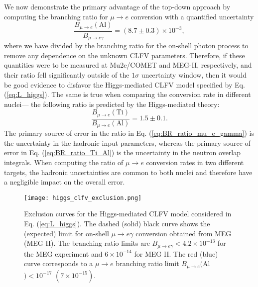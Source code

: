 \documentclass{book}[letterpaper,12pt]
\begin{document}
We now demonstrate the primary advantage of the top-down approach by computing the branching ratio for $\mu\rightarrow e$ conversion with a quantified uncertainty 
\begin{equation}
\frac{B_{\mu\rightarrow e}(\mathrm{Al})}{B_{\mu\rightarrow e\gamma}}=\left(8.7\pm 0.3\right)\times 10^{-3},
\label{eq:BR_ratio_mu_e_gamma}
\end{equation}
where we have divided by the branching ratio for the on-shell photon process to remove any dependence on the unknown CLFV parameters. Therefore, if these quantities were to be measured at Mu2e/COMET and MEG-II, respectively, and their ratio fell significantly outside of the $1\sigma$ uncertainty window, then it would be good evidence to disfavor the Higgs-mediated CLFV model specified by Eq. (\ref{eq:L_higgs}). The same is true when comparing the conversion rate in different nuclei--- the following ratio is predicted by the Higgs-mediated theory:
\begin{equation}
\frac{B_{\mu\rightarrow e}(\mathrm{Ti})}{B_{\mu\rightarrow e}(\mathrm{Al})}=1.5\pm 0.1.
\label{eq:BR_ratio_Ti_Al}
\end{equation}
The primary source of error in the ratio in Eq. (\ref{eq:BR_ratio_mu_e_gamma}) is the uncertainty in the hadronic input parameters, whereas the primary source of error in Eq. (\ref{eq:BR_ratio_Ti_Al}) is the uncertainty in the neutron overlap integrals. When computing the ratio of $\mu\rightarrow e$ conversion rates in two different targets, the hadronic uncertainties are common to both nuclei and therefore have a negligible impact on the overall error.
\begin{figure}
\centering
\texttt{[image: higgs\_clfv\_exclusion.png]}
\caption{Exclusion curves for the Higgs-mediated CLFV model considered in Eq. (\ref{eq:L_higgs}). The dashed (solid) black curve shows the (expected) limit for on-shell $\mu\rightarrow e\gamma$ conversion obtained from MEG (MEG II). The branching ratio limits are $B_{\mu\rightarrow e\gamma}<4.2\times 10^{-13}$ for the MEG experiment and $6\times 10^{-14}$ for MEG II. The red (blue) curve corresponds to a $\mu\rightarrow e$ branching ratio limit $B_{\mu\rightarrow e}($Al$)<10^{-17}$ $(7\times 10^{-15})$.}
\label{fig:higgs_clfv_exclusion}
\end{figure}
\end{document}
